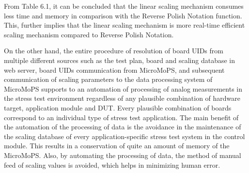 


From Table 6.1, it can be concluded that the linear scaling mechanism consumes less time and memory in comparison with the Reverse Polish Notation function. 
This, further implies that the linear scaling mechanism is more real-time efficient scaling mechanism compared to Reverse Polish Notation. 

On the other hand, the entire procedure of resolution of board UIDs from multiple different sources such as the test plan, board and scaling database in web server, board UIDs communication from MicroMoPS, and subsequent communication of scaling parameters to the data processing system of MicroMoPS supports to an automation of processing of analog measurements in the stress test environment regardless of any plausible combination of hardware target, application module and DUT.
Every plausible combination of boards correspond to an individual type of stress test application. The main benefit of the automation of the processing of data is the avoidance in the maintenance of the scaling database of every application-specific stress test system in the control module. This results in a conservation of quite an amount of memory of the MicroMoPS. Also, by automating the processing of data, the method of manual feed of scaling values is avoided, which helps in minimizing human error.  

